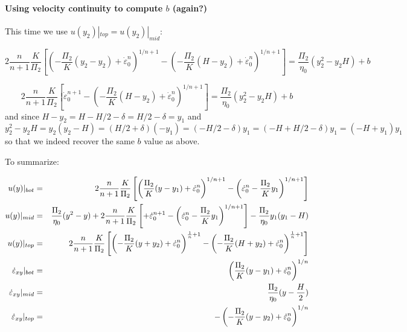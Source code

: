 \paragraph{Using velocity continuity to compute $b$ (again?)} 
This time we use $u(y_2)|_{top}=u(y_2)|_{mid}$: 

\[
2 \frac{n}{n+1} \frac{K}{\Pi_2}
\left[
\left( -\frac{\Pi_2}{K}(y_2-y_2)+ \dot{\varepsilon}_0^{n}  \right)^{1/n+ 1 } - 
\left( -\frac{\Pi_2}{K}(H-y_2)+ \dot{\varepsilon}_0^{n}  \right)^{1/n+ 1 } 
\right]
= \frac{\Pi_2}{\eta_0} (y_2^2  -  y_2 H) + b
\]

\[
2 \frac{n}{n+1} \frac{K}{\Pi_2}
\left[
\dot{\varepsilon}_0^{n+1}  - 
\left( -\frac{\Pi_2}{K}(H-y_2)+   \dot{\varepsilon}_0^{n}  \right)^{1/n+ 1 } 
\right]
=
\frac{\Pi_2}{\eta_0} (y_2^2  -  y_2 H) + b
\]
and since $H-y_2 = H- H/2 - \delta = H/2 -\delta = y_1$ and
\[
y_2^2-y_2H = y_2(y_2 - H) = (H/2+\delta)(-y_1) 
= (-H/2-\delta)y_1
= (-H+H/2-\delta)y_1
= (-H+y_1)y_1
\] 
so that we indeed recover the same $b$ value as above. 

\newpage
To summarize:

\begin{mdframed}[backgroundcolor=blue!5]
\begin{eqnarray}
u(y)|_{bot} 
&=& 
2 \frac{n}{n+1} \frac{K}{\Pi_2} \left[ \left( \frac{\Pi_2}{K} (y-y_1) +  \dot{\varepsilon}_0^{n}    \right)^{1/n+ 1 } 
- \left(   \dot{\varepsilon}_0^{n}  - \frac{\Pi_2}{K}y_1     \right)^{1/n+ 1 } \right]
\nonumber\\
u(y)|_{mid} 
&=& \frac{\Pi_2}{\eta_0} (y^2  -  y) + 
2 \frac{n}{n+1} \frac{K}{\Pi_2} \left[ 
+ \dot{\varepsilon}_0^{n+ 1} 
- \left( \dot{\varepsilon}_0^{n}  - \frac{\Pi_2}{K}y_1  \right)^{1/n+ 1 } \right]
- \frac{\Pi_2}{\eta_0} y_1 (y_1  - H) 
\nonumber\\
u(y)|_{top} 
&=& 2 \frac{n}{n+1} \frac{K}{\Pi_2}
\left[
\left(-\frac{\Pi_2}{K}(y+y_2)+ \dot{\varepsilon}_0^{n}\right)^{\frac{1}{n}+ 1 } - 
\left(-\frac{\Pi_2}{K}(H+y_2)+ \dot{\varepsilon}_0^{n}\right)^{\frac{1}{n}+ 1 } 
\right]
\nonumber\\
\dot{\varepsilon}_{xy}|_{bot}
&=& \left( \frac{\Pi_2}{K} (y-y_1) + \dot{\varepsilon}_0^{n}   \right)^{1/n} \nonumber\\
\dot{\varepsilon}_{xy}|_{mid}
&=& \frac{\Pi_2}{\eta_0} (y  -\frac{H}{2} ) \nonumber\\
\dot{\varepsilon}_{xy}|_{top}
&=&  - \left( - \frac{\Pi_2}{K} (y-y_2) +  \dot{\varepsilon}_0^{n} \right)^{1/n} \nonumber
\end{eqnarray}
\end{mdframed}

